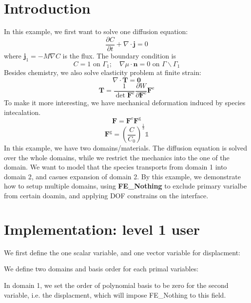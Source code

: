 \hypertarget{growth_Introduction}{}\section{Introduction}\label{growth_Introduction}
In this example, we first want to solve one diffusion equation\+: \[ \frac{\partial C}{\partial t}+\nabla\cdot\boldsymbol{j}=0 \] where $\boldsymbol{j}_1=-M\nabla C$ is the flux. The boundary condition is \[ C=1 \text{ on }\Gamma_1; \quad \nabla \mu\cdot\boldsymbol{n}=0 \text{ on }\Gamma \backslash \Gamma_1 \] Besides chemistry, we also solve elasticity problem at finite strain\+: \[ \nabla\cdot\boldsymbol{T} = \boldsymbol{0} \] \[ \boldsymbol{T}= \frac{1}{\det{\boldsymbol{F}^{\text{e}}}}\frac{\partial W}{\partial \boldsymbol{F}^{\text{e}}}\boldsymbol{F}^{\text{e}} \] To make it more interesting, we have mechanical deformation induced by species intecalation. \[ \boldsymbol{F}=\boldsymbol{F}^{\text{e}}\boldsymbol{F}^{\text{g}} \] \[ \boldsymbol{F}^{\text{g}}=\left(\frac{C}{C_\text{0}}\right)^{\frac{1}{3}}\mathbb{1} \] In this example, we have two domains/materials. The diffusion equation is solved over the whole domains, while we restrict the mechanics into the one of the domain. We want to model that the species transports from domain 1 into domain 2, and casues expansion of domain 2. By this example, we demonstrate how to setup multiple domains, using {\bfseries{F\+E\+\_\+\+Nothing}} to exclude primary varialbe from certain doamin, and applying D\+OF constrains on the interface.\hypertarget{growth_imple}{}\section{Implementation\+: level 1 user}\label{growth_imple}
We first define the one scalar variable, and one vector variable for displacment\+: 
\begin{DoxyCode}{0}
\end{DoxyCode}
 We define two domains and basis order for each primal variables\+: 
\begin{DoxyCode}{0}
\end{DoxyCode}
 In domain 1, we set the order of polynomial basis to be zero for the second variable, i.\+e. the displacment, which will impose F\+E\+\_\+\+Nothing to this field.

